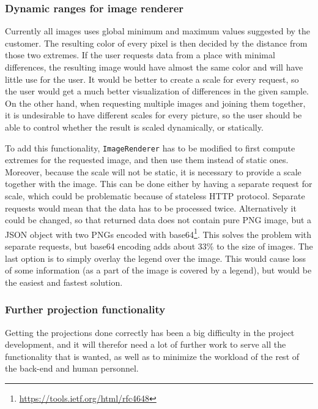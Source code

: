 \documentclass[11pt,a4paper,titlepage,oneside]{report}
\begin{document}
\subsubsection{Dynamic ranges for image renderer}
Currently all images uses global minimum and maximum values suggested by the customer. The resulting color of every pixel is then decided by the distance from those two extremes. If the user requests data from a place with minimal differences, the resulting image would have almost the same color and will have little use for the user. It would be better to create a scale for every request, so the user would get a much better visualization of differences in the given sample. On the other hand, when requesting multiple images and joining them together, it is undesirable to have different scales for every picture, so the user should be able to control whether the result is scaled dynamically, or statically.

To add this functionality, \texttt{ImageRenderer} has to be modified to first compute extremes for the requested image, and then use them instead of static ones. Moreover, because the scale will not be static, it is necessary to provide a scale together with the image. This can be done either by having a separate request for scale, which could be problematic because of stateless HTTP protocol. Separate requests would mean that the data has to be processed twice. Alternatively it could be changed, so that returned data does not contain pure \gls{PNG} image, but a JSON object with two \gls{PNG}s encoded with base64\footnote{\url{https://tools.ietf.org/html/rfc4648}}. This solves the problem with separate requests, but base64 encoding adds about 33\% to the size of images. The last option is to simply overlay the legend over the image. This would cause loss of some information (as a part of the image is covered by a legend), but would be the easiest and fastest solution.

\subsubsection{Further projection functionality}
Getting the projections done correctly has been a big difficulty in the project development, and it will therefor need a lot of further work to serve all the functionality that is wanted, as well as to minimize the workload of the rest of the \gls{back-end} and human personnel.
\end{document}
